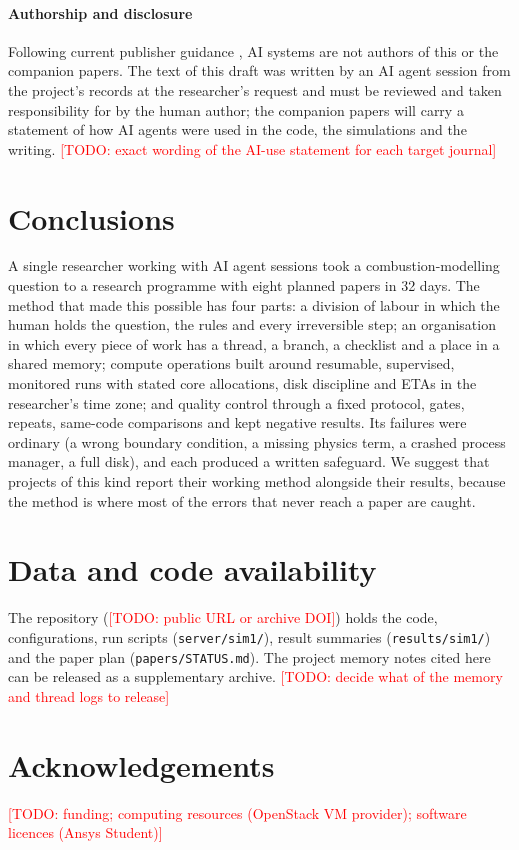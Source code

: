 \documentclass[preprint,review,12pt]{elsarticle}
\newcommand{\todo}[1]{\textcolor{red}{[TODO: #1]}}
\begin{document}
\paragraph{Authorship and disclosure} Following current publisher guidance \cite{nature2023ground,cope2023ai}, AI
systems are not authors of this or the companion papers. The text of this draft was written by an AI agent session from
the project's records at the researcher's request and must be reviewed and taken responsibility for by the human
author; the companion papers will carry a statement of how AI agents were used in the code, the simulations and the
writing. \todo{exact wording of the AI-use statement for each target journal}

\section{Conclusions}

A single researcher working with AI agent sessions took a combustion-modelling question to a research programme with
eight planned papers in 32 days. The method that made this possible has four parts: a division of labour in which the
human holds the question, the rules and every irreversible step; an organisation in which every piece of work has a
thread, a branch, a checklist and a place in a shared memory; compute operations built around resumable, supervised,
monitored runs with stated core allocations, disk discipline and ETAs in the researcher's time zone; and quality control
through a fixed protocol, gates, repeats, same-code comparisons and kept negative results. Its failures were ordinary
(a wrong boundary condition, a missing physics term, a crashed process manager, a full disk), and each produced a
written safeguard. We suggest that projects of this kind report their working method alongside their results, because
the method is where most of the errors that never reach a paper are caught.

\section*{Data and code availability}
The repository (\todo{public URL or archive DOI}) holds the code, configurations, run scripts (\texttt{server/sim1/}),
result summaries (\texttt{results/sim1/}) and the paper plan (\texttt{papers/STATUS.md}). The project memory notes
cited here can be released as a supplementary archive. \todo{decide what of the memory and thread logs to release}

\section*{Acknowledgements}
\todo{funding; computing resources (OpenStack VM provider); software licences (Ansys Student)}



\end{document}
